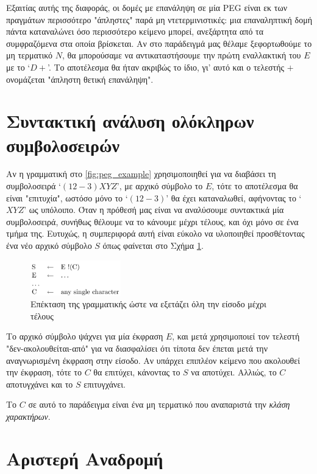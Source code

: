 \documentclass[diploma]{softlab-thesis}
\begin{document}
Εξαιτίας αυτής της διαφοράς, οι δομές με επανάληψη σε μία PEG είναι εκ των πραγμάτων περισσότερο "άπληστες" παρά μη ντετερμινιστικές: μια επαναληπτική δομή πάντα καταναλώνει όσο περισσότερο κείμενο μπορεί, ανεξάρτητα από τα συμφραζόμενα στα οποία βρίσκεται. 
Αν στο παράδειγμά μας θέλαμε ξεφορτωθούμε το μη τερματικό $N$, θα μπορούσαμε να αντικαταστήσουμε την πρώτη εναλλακτική του $E$ με το `$D+$'.
Το αποτέλεσμα θα ήταν ακριβώς το ίδιο, γι' αυτό και ο τελεστής $+$ ονομάζεται "άπληστη θετική επανάληψη".

\section{Συντακτική ανάλυση ολόκληρων συμβολοσειρών}
Αν η γραμματική στο \ref{fig:peg_example} χρησιμοποιηθεί για να διαβάσει τη συμβολοσειρά `$(12-3)XYZ$', με αρχικό σύμβολο το $E$, τότε το αποτέλεσμα θα είναι "επιτυχία", ωστόσο μόνο το `$(12-3)$' θα έχει καταναλωθεί, αφήνοντας το `$XYZ$' ως υπόλοιπο. 
Όταν η πρόθεσή μας είναι να αναλύσουμε συντακτικά μία συμβολοσειρά, συνήθως θέλουμε να το κάνουμε μέχρι τέλους, και όχι μόνο σε ένα τμήμα της.
Ευτυχώς, η συμπεριφορά αυτή είναι εύκολο να υλοποιηθεί προσθέτοντας ένα νέο αρχικό σύμβολο $S$ όπως φαίνεται στο Σχήμα \ref{fig:whole_input}.

\begin{figure}[h]
    \centering
	\includegraphics[width=0.35\textwidth]{pics/whole_input}
	\caption{Επέκταση της γραμματικής ώστε να εξετάζει όλη την είσοδο μέχρι τέλους}
    \label{fig:whole_input}
\end{figure}

Το αρχικό σύμβολο ψάχνει για μία έκφραση $E$, και μετά χρησιμοποιεί τον τελεστή "δεν-ακολουθείται-από" για να διασφαλίσει ότι τίποτα δεν έπεται μετά την αναγνωρισμένη έκφραση στην είσοδο.
Αν υπάρχει επιπλέον κείμενο που ακολουθεί την έκφραση, τότε το $C$ θα επιτύχει, κάνοντας το $S$ να αποτύχει. Αλλιώς, το $C$ αποτυγχάνει και το $S$ επιτυγχάνει.

Το $C$ σε αυτό το παράδειγμα είναι ένα μη τερματικό που αναπαριστά την \textit{κλάση χαρακτήρων}.

\section{Αριστερή Αναδρομή}
\end{document}
